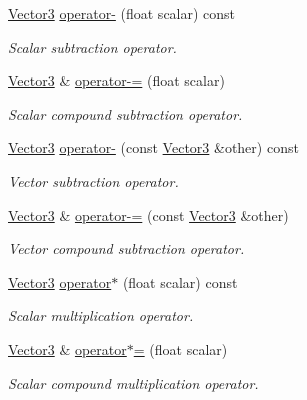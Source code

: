 \begin{DoxyCompactItemize}
\hyperlink{classchaos_1_1gfx_1_1_vector3}{Vector3} \hyperlink{classchaos_1_1gfx_1_1_vector3_a4dae54ff2ff65a8a43572e7aad2b21ba}{operator-\/} (float scalar) const 
\begin{DoxyCompactList}\small\item\em Scalar subtraction operator. \end{DoxyCompactList}\item 
\hyperlink{classchaos_1_1gfx_1_1_vector3}{Vector3} \& \hyperlink{classchaos_1_1gfx_1_1_vector3_a7da527567f0c3f950386cfde14e0c01a}{operator-\/=} (float scalar)
\begin{DoxyCompactList}\small\item\em Scalar compound subtraction operator. \end{DoxyCompactList}\item 
\hyperlink{classchaos_1_1gfx_1_1_vector3}{Vector3} \hyperlink{classchaos_1_1gfx_1_1_vector3_aa04a47959b61f1e3f1c48b8709889f9d}{operator-\/} (const \hyperlink{classchaos_1_1gfx_1_1_vector3}{Vector3} \&other) const 
\begin{DoxyCompactList}\small\item\em Vector subtraction operator. \end{DoxyCompactList}\item 
\hyperlink{classchaos_1_1gfx_1_1_vector3}{Vector3} \& \hyperlink{classchaos_1_1gfx_1_1_vector3_a66c22970fa9dc7499b894313d1c66961}{operator-\/=} (const \hyperlink{classchaos_1_1gfx_1_1_vector3}{Vector3} \&other)
\begin{DoxyCompactList}\small\item\em Vector compound subtraction operator. \end{DoxyCompactList}\item 
\hyperlink{classchaos_1_1gfx_1_1_vector3}{Vector3} \hyperlink{classchaos_1_1gfx_1_1_vector3_a39855071d6101e932fe6fb382e3a2f9e}{operator$\ast$} (float scalar) const 
\begin{DoxyCompactList}\small\item\em Scalar multiplication operator. \end{DoxyCompactList}\item 
\hyperlink{classchaos_1_1gfx_1_1_vector3}{Vector3} \& \hyperlink{classchaos_1_1gfx_1_1_vector3_abd751363ea77af4f9e673cf092f49473}{operator$\ast$=} (float scalar)
\begin{DoxyCompactList}\small\item\em Scalar compound multiplication operator. \end{DoxyCompactList}\item 

\end{DoxyCompactItemize}
